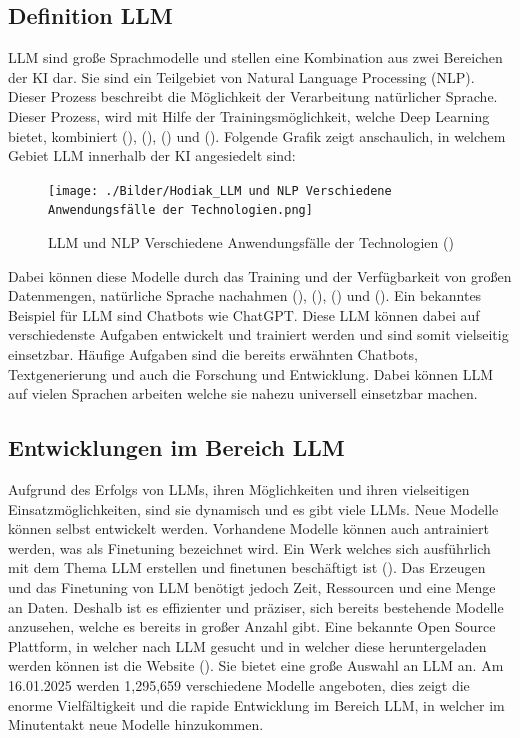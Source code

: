 \documentclass[12pt,toc=bib,toc=listof]{scrreprt}
\begin{document}
\subsection{Definition LLM} %
\label{sec:definitionLLM}
LLM sind große Sprachmodelle und stellen eine Kombination aus zwei Bereichen der KI dar. Sie sind ein Teilgebiet von Natural Language Processing (NLP). Dieser Prozess beschreibt die Möglichkeit der Verarbeitung natürlicher Sprache. Dieser Prozess, wird mit Hilfe der Trainingsmöglichkeit, welche Deep Learning bietet, kombiniert (\cite{Chang2023}), (\cite{Kaddour2023}), (\cite{Naveed2024}) und (\cite{Schneider2024}). Folgende Grafik zeigt anschaulich, in welchem Gebiet LLM innerhalb der KI angesiedelt sind:

\begin{figure} [H]
    \centering
    \texttt{[image: ./Bilder/Hodiak\_LLM und NLP Verschiedene Anwendungsfälle der Technologien.png]}
    \caption{LLM und NLP Verschiedene Anwendungsfälle der Technologien (\cite{Hodiak2024})}
    \label{fig:enter-label}
\end{figure}
\noindent Dabei können diese Modelle durch das Training und der Verfügbarkeit von großen Datenmengen, natürliche Sprache nachahmen (\cite{Chang2023}), (\cite{Kaddour2023}), (\cite{Naveed2024}) und (\cite{Schneider2024}). Ein bekanntes Beispiel für LLM sind Chatbots wie ChatGPT. Diese LLM können dabei auf verschiedenste Aufgaben entwickelt und trainiert werden und sind somit vielseitig einsetzbar. Häufige Aufgaben sind die bereits erwähnten Chatbots, Textgenerierung und auch die Forschung und Entwicklung. Dabei können LLM auf vielen Sprachen arbeiten welche sie nahezu universell einsetzbar machen.

\subsection{Entwicklungen im Bereich LLM} %
\label{sec:entwicklungenImBereichLLM}
Aufgrund des Erfolgs von LLMs, ihren Möglichkeiten und ihren vielseitigen Einsatzmöglichkeiten, sind sie dynamisch und es gibt viele LLMs. Neue Modelle können selbst entwickelt werden. Vorhandene Modelle können auch antrainiert werden, was als Finetuning bezeichnet wird. Ein Werk welches sich ausführlich mit dem Thema LLM erstellen und finetunen beschäftigt ist (\cite{Géron2019}). Das Erzeugen und das Finetuning von LLM benötigt jedoch Zeit, Ressourcen und eine Menge an Daten. Deshalb ist es effizienter und präziser, sich bereits bestehende Modelle anzusehen, welche es bereits in großer Anzahl gibt. Eine bekannte Open Source Plattform, in welcher nach LLM gesucht und in welcher diese heruntergeladen werden können ist die Website (\cite{HuggingFace2025}). Sie bietet eine große Auswahl an LLM an. Am 16.01.2025 werden 1,295,659 verschiedene Modelle angeboten, dies zeigt die enorme Vielfältigkeit und die rapide Entwicklung im Bereich LLM, in welcher im Minutentakt neue Modelle hinzukommen.\\
\end{document}
